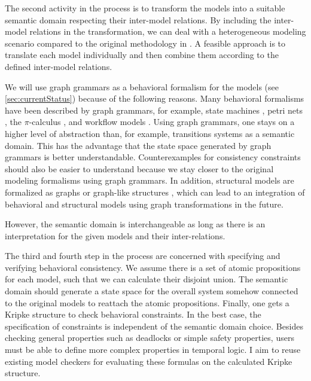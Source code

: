 \documentclass[conference]{IEEEtran}
\begin{document}
The second activity in the process is to transform the models into a suitable semantic domain respecting their inter-model relations.
By including the inter-model relations in the transformation, we can deal with a heterogeneous modeling scenario compared to the original methodology in \cite{engelsMethodologySpecifyingAnalyzing2001}.
A feasible approach is to translate each model individually and then combine them according to the defined inter-model relations.

We will use graph grammars as a behavioral formalism for the models (see \autoref{sec:currentStatus}) because of the following reasons.
Many behavioral formalisms have been described by graph grammars, for example, state machines \cite{kuskeFormalSemanticsUML2001, varroFormalSemanticsUML2002}, petri nets \cite{ehrigGraphGrammarsPetri2004}, the $\pi$-calculus \cite{gadducciGraphRewritingPcalculus2007}, and workflow models \cite{rutleMetamodellingApproachBehavioural2012}.
Using graph grammars, one stays on a higher level of abstraction than, for example, transitions systems as a semantic domain.
This has the advantage that the state space generated by graph grammars is better understandable.
Counterexamples for consistency constraints should also be easier to understand because we stay closer to the original modeling formalisms using graph grammars.
In addition, structural models are formalized as graphs or graph-like structures \cite{stunkelMultipleModelSynchronization2020}, which can lead to an integration of behavioral and structural models using graph transformations in the future. 

However, the semantic domain is interchangeable as long as there is an interpretation for the given models and their inter-relations.

The third and fourth step in the process are concerned with specifying and verifying behavioral consistency.
We assume there is a set of atomic propositions for each model, such that we can calculate their disjoint union.
The semantic domain should generate a state space for the overall system somehow connected to the original models to reattach the atomic propositions.
Finally, one gets a Kripke structure to check behavioral constraints.
In the best case, the specification of constraints is independent of the semantic domain choice.
Besides checking general properties such as deadlocks or simple safety properties, users must be able to define more complex properties in temporal logic.
I aim to reuse existing model checkers for evaluating these formulas on the calculated Kripke structure.
\end{document}
